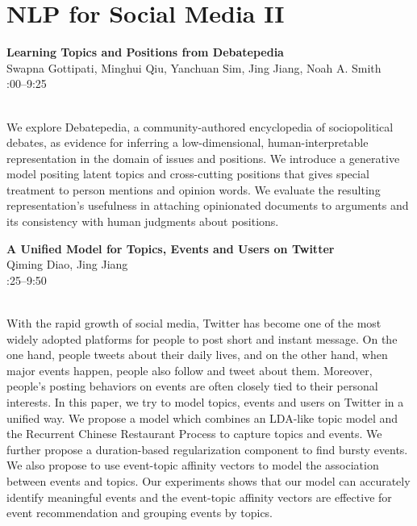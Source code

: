 \documentclass[twoside,makeidx]{book}
\renewcommand{\normalsize}{\fontsize{8}{9}\selectfont}
\renewcommand{\small}{\fontsize{7}{8}\selectfont}
\begin{document}
\section{NLP for Social Media II}
\vspace{-1em}
\par\vspace{2em}\noindent%
\begin{minipage}{\linewidth}%
\begin{center}
\textbf{\normalsize Learning Topics and Positions from Debatepedia}\\
\normalsize  Swapna Gottipati,  Minghui Qiu,  Yanchuan Sim,  Jing Jiang,  Noah A. Smith\\
{\small 9:00--9:25}\\
\end{center}
\end{minipage}\\[0.5em]
\nopagebreak%
\noindent%
{\small We explore Debatepedia, a community-authored encyclopedia of sociopolitical debates, as evidence for inferring a low-dimensional, human-interpretable representation in the domain of issues and positions. We introduce a generative model positing latent topics and cross-cutting positions that gives special treatment to person mentions and opinion words. We evaluate the resulting representation's usefulness in attaching opinionated documents to arguments and its consistency with human judgments about positions.}
\par\vspace{2em}\noindent%
\begin{minipage}{\linewidth}%
\begin{center}
\textbf{\normalsize A Unified Model for Topics, Events and Users on Twitter}\\
\normalsize  Qiming Diao,  Jing Jiang\\
{\small 9:25--9:50}\\
\end{center}
\end{minipage}\\[0.5em]
\nopagebreak%
\noindent%
{\small With the rapid growth of social media, Twitter has become one of the most widely adopted platforms for people to post short and instant message. On the one hand, people tweets about their daily lives, and on the other hand, when major events happen, people also follow and tweet about them. Moreover, people's posting behaviors on events are often closely tied to their personal interests. In this paper, we try to model topics, events and users on Twitter in a unified way. We propose a model which combines an LDA-like topic model and the Recurrent Chinese Restaurant Process to capture topics and events. We further propose a duration-based regularization component to find bursty events. We also propose to use event-topic affinity vectors to model the association between events and topics. Our experiments shows that our model can accurately identify meaningful events and the event-topic affinity vectors are effective for event recommendation and grouping events by topics.}
\end{document}
